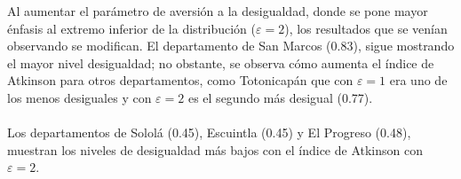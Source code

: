 Al aumentar el parámetro de aversión a la desigualdad, donde se pone mayor énfasis al extremo inferior de la distribución  ($\varepsilon = \mbox{2}$), los resultados que se venían observando se modifican. El departamento de San Marcos (0.83), sigue mostrando el mayor nivel desigualdad; no obstante, se observa cómo aumenta el índice de Atkinson para otros departamentos, como Totonicapán  que con $\varepsilon = \mbox{1}$ era uno de los menos desiguales y con $\varepsilon = \mbox{2}$ es el segundo más desigual (0.77).  \\\\ Los departamentos de Sololá (0.45), Escuintla (0.45) y El Progreso (0.48), muestran los niveles de desigualdad más bajos con el índice de Atkinson con  $\varepsilon = \mbox{2}$.